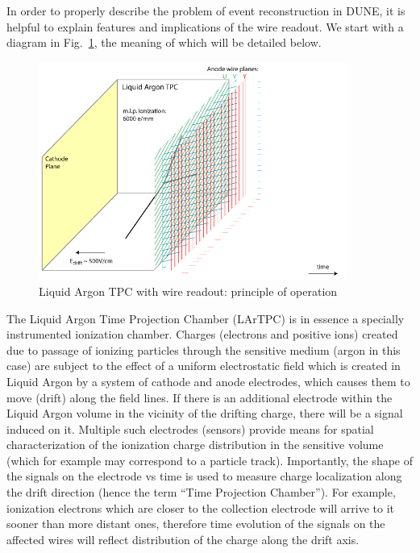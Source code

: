 In order to properly describe the problem of event reconstruction in DUNE, it is helpful to explain
features and implications of the wire readout. We start with a diagram in Fig.~\ref{fig:signal-0}, the meaning of which will be detailed below.
\label{sec:wirecell}
\begin{figure}[h!]
	\centering
	\includegraphics[width=0.9\textwidth]{signal-0.png}
	\caption{Liquid Argon TPC with wire readout: principle of operation}
	\label{fig:signal-0}
\end{figure}

The Liquid Argon Time Projection Chamber (LArTPC) is in essence a specially instrumented ionization chamber. Charges (electrons and positive ions)
created due to passage of ionizing particles through the sensitive medium (argon in this case) are subject to the effect of a uniform electrostatic
field which is created in Liquid Argon by a system of cathode and anode electrodes, which causes them to move (drift) along the field lines.
If there is an additional electrode within the Liquid Argon volume in the vicinity of the drifting charge, there will be a signal induced on it. Multiple such
electrodes (sensors) provide means for spatial characterization of the ionization charge distribution in the sensitive volume (which for example may
correspond to a particle track). Importantly, the shape of the signals on the electrode vs time is used to measure charge localization along the drift
direction (hence the term ``Time Projection Chamber''). For example, ionization electrons which are closer to the collection electrode will arrive to it sooner than
more distant ones, therefore time evolution of the signals on the affected wires will reflect distribution of the charge along the drift axis.

